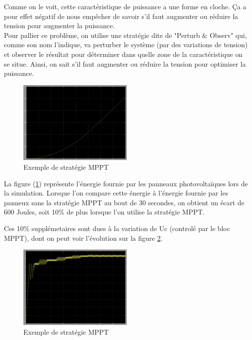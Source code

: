 Comme on le voit, cette caractéristique de puissance a une forme en cloche. Ça a pour effet négatif de nous empêcher de savoir s'il faut augmenter ou réduire la tension pour augmenter la puissance.\\
Pour pallier ce problème, on utilise une stratégie dite de "Perturb \& Observ" qui, comme son nom l'indique, va perturber le système (par des variations de tension) et observer le résultat pour déterminer dans quelle zone de la caractéristique on se situe. Ainsi, on sait s'il faut augmenter ou réduire la tension pour optimiser la puissance.\\


\begin{figure}[ht]
	\begin{center}
	\includegraphics[width=0.5\textwidth]{images/Energie_MPPT.png}
	\caption{Exemple de stratégie MPPT}\label{img:courbe energie MPPT}
	\end{center}
\end{figure}
\FloatBarrier 

La figure (\ref{img:courbe energie MPPT}) représente l'énergie fournie par les panneaux photovoltaïques lors de la simulation. Lorsque l'on compare cette énergie à l'énergie fournie par les panneux sans la stratégie MPPT au bout de 30 secondes, on obtient un écart de 600 Joules, soit 10\% de plus lorsque l'on utilise la stratégie MPPT.

Ces 10\% supplémetaires sont dues à la variation de Uc (controlé par le bloc MPPT), dont on peut voir l'évolution sur la figure \ref{img:courbe Uc MPPT}.

\begin{figure}[ht]
	\begin{center}
	\includegraphics[width=0.5\textwidth]{images/Uc_MPPT.png}
	\caption{Exemple de stratégie MPPT}\label{img:courbe Uc MPPT}
	\end{center}
\end{figure}
\FloatBarrier 

